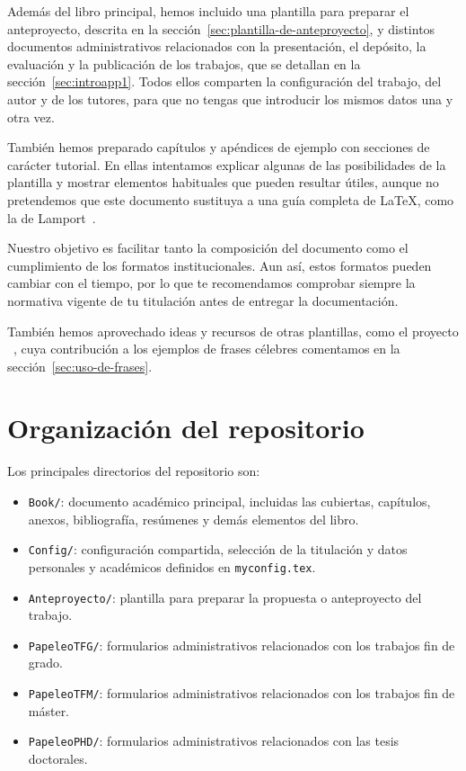 Además del libro principal, hemos incluido una plantilla para preparar el anteproyecto, descrita en la sección~\ref{sec:plantilla-de-anteproyecto}, y distintos documentos administrativos relacionados con la presentación, el depósito, la evaluación y la publicación de los trabajos, que se detallan en la sección~\ref{sec:introapp1}. Todos ellos comparten la configuración del trabajo, del autor y de los tutores, para que no tengas que introducir los mismos datos una y otra vez.

También hemos preparado capítulos y apéndices de ejemplo con secciones de carácter tutorial. En ellas intentamos explicar algunas de las posibilidades de la plantilla y mostrar elementos habituales que pueden resultar útiles, aunque no pretendemos que este documento sustituya a una guía completa de \LaTeX{}, como la de Lamport~\cite{lamport94}.

Nuestro objetivo es facilitar tanto la composición del documento como el cumplimiento de los formatos institucionales. Aun así, estos formatos pueden cambiar con el tiempo, por lo que te recomendamos comprobar siempre la normativa vigente de tu titulación antes de entregar la documentación.

También hemos aprovechado ideas y recursos de otras plantillas, como el proyecto \texis{}~\cite{texis}, cuya contribución a los ejemplos de frases célebres comentamos en la sección~\ref{sec:uso-de-frases}.

\section{Organización del repositorio}
\label{sec:organizacion-repositorio}

Los principales directorios del repositorio son:

\begin{itemize}
  \item \texttt{Book/}: documento académico principal, incluidas las cubiertas, capítulos, anexos, bibliografía, resúmenes y demás elementos del libro.
  \item \texttt{Config/}: configuración compartida, selección de la titulación y datos personales y académicos definidos en \texttt{myconfig.tex}.
  \item \texttt{Anteproyecto/}: plantilla para preparar la propuesta o anteproyecto del trabajo.
  \item \texttt{PapeleoTFG/}: formularios administrativos relacionados con los trabajos fin de grado.
  \item \texttt{PapeleoTFM/}: formularios administrativos relacionados con los trabajos fin de máster.
  \item \texttt{PapeleoPHD/}: formularios administrativos relacionados con las tesis doctorales.
\end{itemize}

